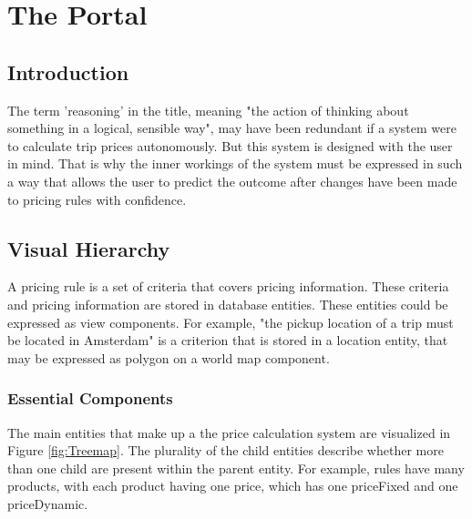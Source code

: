 \graphicspath{{Chapter5/Figs/Vector/}{Chapter5/Figs/}}

\chapter{The Portal}
\section{Introduction}
The term 'reasoning' in the title, meaning "the action of thinking about something in a logical, sensible way", may have been redundant if a system were to calculate trip prices autonomously. But this system is designed with the user in mind. That is why the inner workings of the system must be expressed in such a way that allows the user to predict the outcome after changes have been made to pricing rules with confidence.

\section{Visual Hierarchy}
A pricing rule is a set of criteria that covers pricing information. These criteria and pricing information are stored in database entities. These entities could be expressed as view components. For example, "the pickup location of a trip must be located in Amsterdam" is a criterion that is stored in a location entity, that may be expressed as polygon on a world map component.

\subsection{Essential Components}
The main entities that make up a the price calculation system are visualized in Figure \ref{fig:Treemap}. The plurality of the child entities describe whether more than one child are present within the parent entity. For example, rules have many products, with each product having one price, which has one priceFixed and one priceDynamic.

